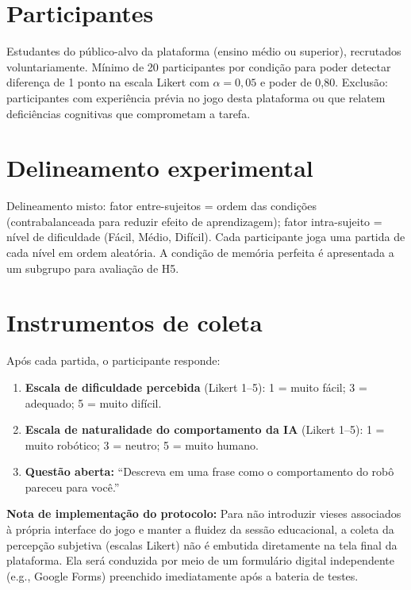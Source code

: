 \documentclass[
    12pt,
    openright,
    twoside,
    a4paper,
    english,
    brazil
]{abntex2}
\begin{document}
\section{Participantes}

Estudantes do público-alvo da plataforma (ensino médio ou superior), recrutados voluntariamente. Mínimo de 20 participantes por condição para poder detectar diferença de 1 ponto na escala Likert com $\alpha = 0{,}05$ e poder de 0,80. Exclusão: participantes com experiência prévia no jogo desta plataforma ou que relatem deficiências cognitivas que comprometam a tarefa.

\section{Delineamento experimental}

Delineamento misto: fator entre-sujeitos = ordem das condições (contrabalanceada para reduzir efeito de aprendizagem); fator intra-sujeito = nível de dificuldade (Fácil, Médio, Difícil). Cada participante joga uma partida de cada nível em ordem aleatória. A condição de memória perfeita é apresentada a um subgrupo para avaliação de H5.

\section{Instrumentos de coleta}

Após cada partida, o participante responde:

\begin{enumerate}
  \item \textbf{Escala de dificuldade percebida} (Likert 1--5): 1 = muito fácil; 3 = adequado; 5 = muito difícil.
  \item \textbf{Escala de naturalidade do comportamento da IA} (Likert 1--5): 1 = muito robótico; 3 = neutro; 5 = muito humano.
  \item \textbf{Questão aberta:} ``Descreva em uma frase como o comportamento do robô pareceu para você.''
\end{enumerate}

\textbf{Nota de implementação do protocolo:} Para não introduzir vieses associados à própria interface do jogo e manter a fluidez da sessão educacional, a coleta da percepção subjetiva (escalas Likert) não é embutida diretamente na tela final da plataforma. Ela será conduzida por meio de um formulário digital independente (e.g., Google Forms) preenchido imediatamente após a bateria de testes.
\end{document}
